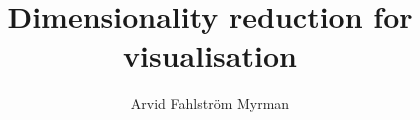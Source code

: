 \documentclass[11pt]{report}
\title{Dimensionality reduction for visualisation}
\author{Arvid Fahlström Myrman}
\begin{document}
\titlepage







\printbibliography
\end{document}
